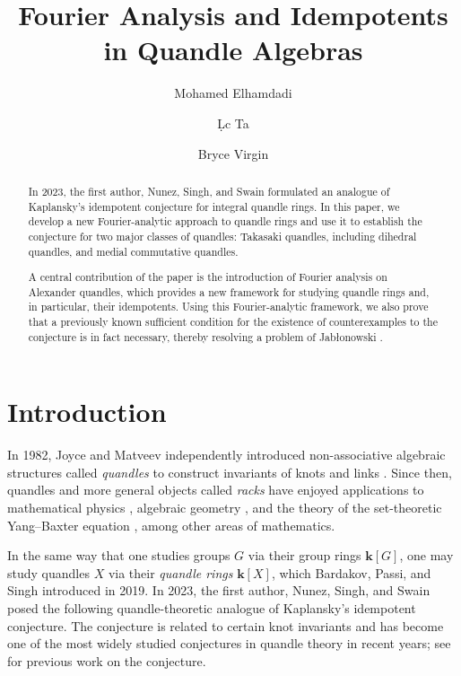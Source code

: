 \documentclass[12pt]{amsart}
\title{Fourier Analysis and Idempotents in Quandle Algebras}
\author{Mohamed Elhamdadi}
\author{{\fontencoding{T5}\selectfont L\d\uhorn c} Ta}
\author{Bryce Virgin}
\theoremstyle{definition}
\theoremstyle{remark}
\begin{document}
\maketitle 

\begin{abstract}
    In 2023, the first author, Nunez, Singh, and Swain \cite{MR4565221} formulated an analogue of Kaplansky's idempotent conjecture for integral quandle rings. In this paper, we develop a new Fourier-analytic approach to quandle rings and use it to establish the conjecture for two major classes of quandles: Takasaki quandles, including dihedral quandles, and medial commutative quandles.
    
A central contribution of the paper is the introduction of Fourier analysis on Alexander quandles, which provides a new framework for studying quandle rings and, in particular, their idempotents.
Using this Fourier-analytic framework, we also prove that a previously known sufficient condition for the existence of counterexamples to the conjecture is in fact necessary, thereby resolving a problem of Jabłonowski \cite{counterexample}. 
\end{abstract}

\section{Introduction}

In 1982, Joyce \cite{Joyce} and Matveev \cite{Matveev} independently introduced non-associative algebraic structures called \emph{quandles} to construct invariants of knots and links \cite{EN}. Since then, quandles and more general objects called \emph{racks} have enjoyed applications to mathematical physics \cite{EB}, algebraic geometry \cite{ta}, and the theory of the set-theoretic Yang--Baxter equation \cite{BES}, among other areas of mathematics. 

In the same way that one studies groups $G$ via their group rings $\mathbf k[G]$, one may study quandles $X$ via their \emph{quandle rings} $\mathbf k[X]$, which Bardakov, Passi, and Singh \cite{BPS} introduced in 2019. In 2023, the first author, Nunez, Singh, and Swain \cite{MR4565221} posed the following quandle-theoretic analogue of Kaplansky's idempotent conjecture. The conjecture is related to certain knot invariants and has become one of the most widely studied conjectures in quandle theory in recent years; see \cites{bardakov-elhamdadi-2026, BES, BPS-2, MR4579329, churchill, ta-2} for previous work on the conjecture.
\end{document}
